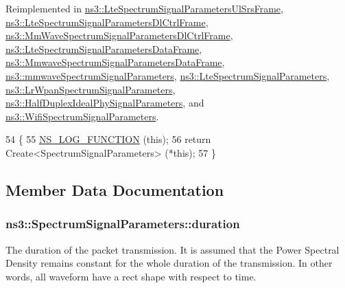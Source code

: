 Reimplemented in \hyperlink{structns3_1_1LteSpectrumSignalParametersUlSrsFrame_a72041a1e823976a854f751ee9253cad8}{ns3\+::\+Lte\+Spectrum\+Signal\+Parameters\+Ul\+Srs\+Frame}, \hyperlink{structns3_1_1LteSpectrumSignalParametersDlCtrlFrame_a3ed9b8fb9d3322d901391f98fa2281b7}{ns3\+::\+Lte\+Spectrum\+Signal\+Parameters\+Dl\+Ctrl\+Frame}, \hyperlink{structns3_1_1MmWaveSpectrumSignalParametersDlCtrlFrame_ac254fd0e4da879c515913a025300d583}{ns3\+::\+Mm\+Wave\+Spectrum\+Signal\+Parameters\+Dl\+Ctrl\+Frame}, \hyperlink{structns3_1_1LteSpectrumSignalParametersDataFrame_ac13f36d239d4aeea449b48be7ff2078d}{ns3\+::\+Lte\+Spectrum\+Signal\+Parameters\+Data\+Frame}, \hyperlink{structns3_1_1MmwaveSpectrumSignalParametersDataFrame_ac4328786c124c54f0cdfc85da110bead}{ns3\+::\+Mmwave\+Spectrum\+Signal\+Parameters\+Data\+Frame}, \hyperlink{structns3_1_1mmwaveSpectrumSignalParameters_a1a6475fdea69e79d03b9d623e23e72e2}{ns3\+::mmwave\+Spectrum\+Signal\+Parameters}, \hyperlink{structns3_1_1LteSpectrumSignalParameters_a0a51e05909f40de703a020d73381b472}{ns3\+::\+Lte\+Spectrum\+Signal\+Parameters}, \hyperlink{structns3_1_1LrWpanSpectrumSignalParameters_a4681b88cdd3971b324c27d58368c31ce}{ns3\+::\+Lr\+Wpan\+Spectrum\+Signal\+Parameters}, \hyperlink{structns3_1_1HalfDuplexIdealPhySignalParameters_a9c978e1b4dd1b284744177ce2c6cdab4}{ns3\+::\+Half\+Duplex\+Ideal\+Phy\+Signal\+Parameters}, and \hyperlink{structns3_1_1WifiSpectrumSignalParameters_a01bb8640ec9f825e7df8c9ca7ff7e680}{ns3\+::\+Wifi\+Spectrum\+Signal\+Parameters}.


\begin{DoxyCode}
54 \{
55   \hyperlink{log-macros-disabled_8h_a90b90d5bad1f39cb1b64923ea94c0761}{NS\_LOG\_FUNCTION} (\textcolor{keyword}{this});
56   \textcolor{keywordflow}{return} Create<SpectrumSignalParameters> (*this);
57 \}
\end{DoxyCode}


\subsection{Member Data Documentation}
\subsubsection[{\texorpdfstring{duration}{duration}}]{ ns3\+::\+Spectrum\+Signal\+Parameters\+::duration}\hypertarget{structns3_1_1SpectrumSignalParameters_aa97149751dce62c95f523622fd5fbfd3}{}\label{structns3_1_1SpectrumSignalParameters_aa97149751dce62c95f523622fd5fbfd3}
The duration of the packet transmission. It is assumed that the Power Spectral Density remains constant for the whole duration of the transmission. In other words, all waveform have a rect shape with respect to time. 
